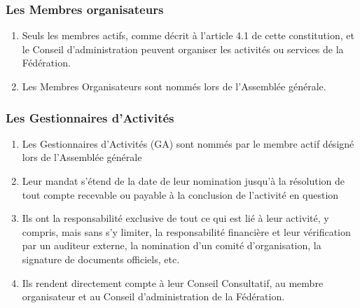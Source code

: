 \subsubsection{Les Membres organisateurs}
\label{les-membres-organisateurs}

\begin{enumerate}
 \item Seuls les membres actifs, comme décrit à l'article 4.1 de cette constitution, et le Conseil d'administration peuvent organiser les activités ou services de la Fédération.
 \item Les Membres Organisateurs sont nommés lors de l'Assemblée générale.
\end{enumerate}

\subsubsection{Les Gestionnaires d'Activités}
\label{les-gestionnaires-d-activites}

\begin{enumerate}
 \item Les Gestionnaires d’Activités (GA) sont nommés par le membre actif désigné lors de l'Assemblée générale
 \item Leur mandat s'étend de la date de leur nomination jusqu'à la résolution de tout compte recevable ou payable à la conclusion de l'activité en question
 \item Ils ont la responsabilité exclusive de tout ce qui est lié à leur activité, y compris, mais sans s'y limiter, la responsabilité financière et leur vérification par un auditeur externe, la nomination d'un comité d'organisation, la signature de documents officiels, etc.
 \item Ils rendent directement compte à leur Conseil Consultatif, au membre organisateur et au Conseil d'administration de la Fédération.
\end{enumerate}
